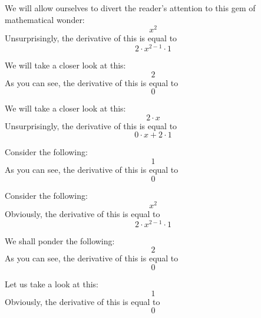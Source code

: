 \documentclass{article}
\begin{document}
We will allow ourselves to divert the reader's attention to this gem of mathematical wonder:
\begin{equation}
x ^{2 } 
\end{equation}
Unsurprisingly, the derivative of this is equal to
\begin{equation}
2 \cdot x ^{2 - 1 } \cdot 1 
\end{equation}

We will take a closer look at this:
\begin{equation}
2 
\end{equation}
As you can see, the derivative of this is equal to
\begin{equation}
0 
\end{equation}

We will take a closer look at this:
\begin{equation}
2 \cdot x 
\end{equation}
Unsurprisingly, the derivative of this is equal to
\begin{equation}
0 \cdot x + 2 \cdot 1 
\end{equation}

Consider the following:
\begin{equation}
1 
\end{equation}
As you can see, the derivative of this is equal to
\begin{equation}
0 
\end{equation}

Consider the following:
\begin{equation}
x ^{2 } 
\end{equation}
Obviously, the derivative of this is equal to
\begin{equation}
2 \cdot x ^{2 - 1 } \cdot 1 
\end{equation}

We shall ponder the following:
\begin{equation}
2 
\end{equation}
As you can see, the derivative of this is equal to
\begin{equation}
0 
\end{equation}

Let us take a look at this:
\begin{equation}
1 
\end{equation}
Obviously, the derivative of this is equal to
\begin{equation}
0 
\end{equation}
\end{document}
